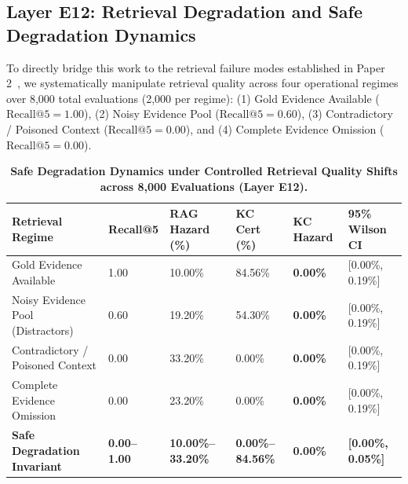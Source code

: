 \documentclass[11pt,a4paper]{article}
\begin{document}
\subsection{Layer E12: Retrieval Degradation and Safe Degradation Dynamics}
To directly bridge this work to the retrieval failure modes established in Paper 2~\cite{agritrust2026}, we systematically manipulate retrieval quality across four operational regimes over 8,000 total evaluations (2,000 per regime): (1) Gold Evidence Available ($\text{Recall}@5 = 1.00$), (2) Noisy Evidence Pool ($\text{Recall}@5 = 0.60$), (3) Contradictory / Poisoned Context ($\text{Recall}@5 = 0.00$), and (4) Complete Evidence Omission ($\text{Recall}@5 = 0.00$).

\begin{table}[t]
\centering
\small
\caption{\textbf{Safe Degradation Dynamics under Controlled Retrieval Quality Shifts across 8,000 Evaluations (Layer E12).}}
\label{tab:retrieval_degradation_results}
\begin{tabularx}{\textwidth}{@{} Y C{1.6cm} R{2.2cm} R{2.2cm} R{2.0cm} C{2.2cm} @{}}
\toprule
\textbf{Retrieval Regime} & \textbf{Recall@5} & \textbf{RAG Hazard (\%)} & \textbf{KC Cert (\%)} & \textbf{KC Hazard} & \textbf{95\% Wilson CI} \\
\midrule
Gold Evidence Available & 1.00 & 10.00\% & 84.56\% & \textbf{0.00\%} & [0.00\%, 0.19\%] \\
Noisy Evidence Pool (Distractors) & 0.60 & 19.20\% & 54.30\% & \textbf{0.00\%} & [0.00\%, 0.19\%] \\
Contradictory / Poisoned Context & 0.00 & 33.20\% & 0.00\% & \textbf{0.00\%} & [0.00\%, 0.19\%] \\
Complete Evidence Omission & 0.00 & 23.20\% & 0.00\% & \textbf{0.00\%} & [0.00\%, 0.19\%] \\
\midrule
\textbf{Safe Degradation Invariant} & \textbf{0.00--1.00} & \textbf{10.00\%--33.20\%} & \textbf{0.00\%--84.56\%} & \textbf{0.00\%} & \textbf{[0.00\%, 0.05\%]} \\
\bottomrule
\end{tabularx}
\vspace{-0.5em}
\end{table}
\end{document}
